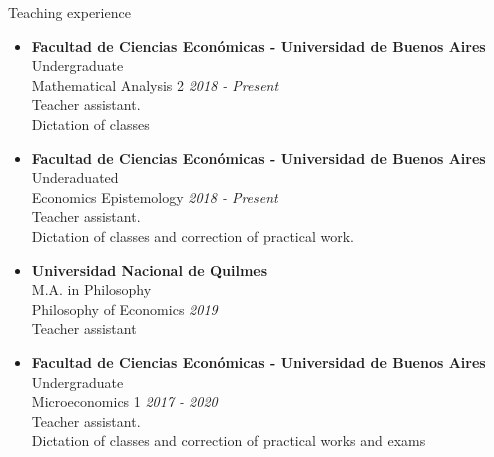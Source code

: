 \documentclass{resume} %
\begin{document}
\begin{rSection}{Teaching experience}
\begin{itemize}


\item {\bf Facultad de Ciencias Económicas - Universidad de Buenos Aires}
\\ Undergraduate
\\Mathematical Analysis 2 \hfill {\em 2018 - Present} 
\\Teacher assistant.
\\Dictation of classes

\item {\bf Facultad de Ciencias Económicas - Universidad de Buenos Aires} 
\\ Underaduated
\\Economics Epistemology \hfill {\em 2018 - Present} 
\\Teacher assistant. 
\\Dictation of classes and correction of practical work.
\item {\bf Universidad Nacional de Quilmes} 
\\ M.A. in Philosophy
\\Philosophy of Economics \hfill {\em 2019} 
\\Teacher assistant
\item {\bf Facultad de Ciencias Económicas - Universidad de Buenos Aires} 
\\ Undergraduate
\\Microeconomics 1 \hfill {\em 2017 - 2020} 
\\Teacher assistant.
\\Dictation of classes and correction of practical works and exams
\end{itemize}

\end{rSection}
\end{document}
